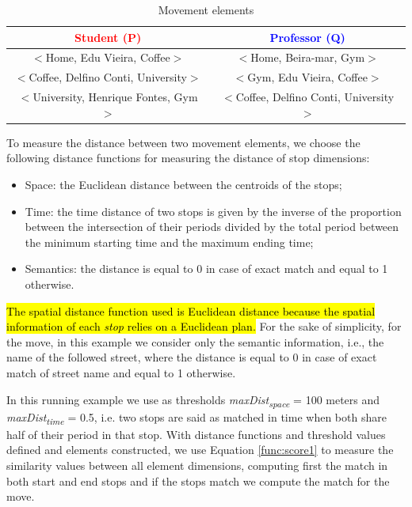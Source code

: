\documentclass[12pt]{article}
\begin{document}
\begin{table}[h!]
\scriptsize
  \centering
  \begin{tabular}{|c|c|}
  	\hline
		\textcolor{Red}{\textbf{Student (P)}} & \textcolor{Blue}{\textbf{Professor (Q)}}\\
  	\hline
      $<$Home, Edu Vieira, Coffee$>$&$<$Home, Beira-mar, Gym$>$\\
      $<$Coffee, Delfino Conti, University$>$&$<$Gym, Edu Vieira, Coffee$>$\\
      $<$University, Henrique Fontes, Gym$>$&$<$Coffee, Delfino Conti, University$>$\\
  	\hline
  \end{tabular}
  \label{tab:wrong}
  \caption{Movement elements}
  \label{tab:SMSM_tuples}
\end{table}

To measure the distance between two movement elements, we choose the following distance functions for measuring the distance of stop dimensions:
\begin{itemize}
  \item Space: the Euclidean distance between the centroids of the stops;
  \item Time: the time distance of two stops is given by the inverse of the proportion between the intersection of their periods divided by the total period between the minimum starting time and the maximum ending time;
  \item Semantics: the distance is equal to 0 in case of exact match and equal to 1 otherwise.
\end{itemize}
\hl{The spatial distance function used is Euclidean distance because the spatial information of each {\emph{stop}} relies on a Euclidean plan.}
For the sake of simplicity, for the move, in this example we consider only the semantic information, i.e., the name of the followed street, where the distance is equal to 0 in case of exact match of street name and equal to 1 otherwise.

In this running example we use as thresholds \textit{maxDist\textsubscript{space}} = 100 meters and \textit{maxDist\textsubscript{time}} = 0.5, i.e. two stops are said as matched in time when both share half of their period in that stop.
With distance functions and threshold values defined and elements constructed, we use Equation \ref{func:score1} to measure the similarity values between all element dimensions, computing first the match in both start and end stops and if the stops match we compute the match for the move. 
\end{document}

